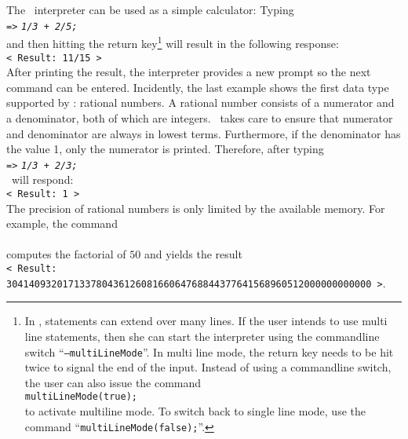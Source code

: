 \noindent
The \setlx\  interpreter can be used as a simple calculator:
Typing 
\\[0.2cm]
\hspace*{1.3cm}
\texttt{=>} \texttt{\textsl{1/3 + 2/5;}}
\\[0.2cm]
and then hitting the return key\footnote{
In \setlx, statements can extend over many lines.  If the user intends to use multi line
statements, then she can start the interpreter using the commandline switch ``\texttt{--multiLineMode}''.
In multi line mode, the return key needs to be hit twice to signal
the end of the input.  Instead of using a commandline switch, the user can also issue the command
\\
\hspace*{1.3cm}
\texttt{multiLineMode(true);}
\\
to activate multiline mode.
To switch back to single line mode, use the command ``\texttt{multiLineMode(false);}''.
} 
will result in the following response:
\\[0.2cm]
\hspace*{1.3cm}
\texttt{< Result: 11/15 >}
\\[0.2cm]
After printing the result, the interpreter provides a new prompt so the next command can
be entered.  Incidently, the last 
example shows the first data type supported by \setlx: rational numbers.  A rational number
consists of a numerator and a denominator, both of which are integers.  \setlx\ takes care to
ensure that numerator and denominator are always in lowest terms.  Furthermore, if the
denominator has the value 1, only the numerator is printed.  Therefore, after typing
\\[0.2cm]
\hspace*{1.3cm}
\texttt{=>} \texttt{\textsl{1/3 + 2/3;}}
\\[0.2cm]
\setlx\ will respond:
\\[0.2cm]
\hspace*{1.3cm}
\texttt{< Result: 1 >}
\\[0.2cm]
The precision of rational numbers is only limited by the available memory.  For example, the command
\\[0.2cm]
\hspace*{1.3cm}
\\[0.2cm]
computes the factorial of $50$ and yields the result
\\[0.2cm]
\hspace*{0.1cm}
\texttt{< Result: 30414093201713378043612608166064768844377641568960512000000000000 >}.
